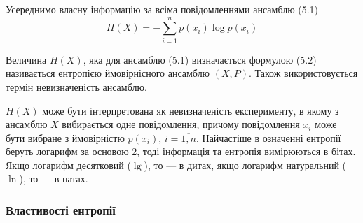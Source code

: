 Усереднимо власну інформацію за всіма повідомленнями ансамблю (5.1)
$$H(X) = - \sum\limits_{i=1}^{n} p(x_i) \log p(x_i)$$

\begin{definition}
    Величина $H(X)$, яка для ансамблю (5.1) визначається
    формулою (5.2) називається ентропією ймовірнісного ансамблю $(X, P)$. Також
    використовується термін невизначеність ансамблю.
\end{definition}

$H(X)$ може бути інтерпретована як невизначеність експерименту, в
якому з ансамблю $X$ вибирається одне повідомлення, причому повідомлення
$x_i$ може бути вибране з ймовірністю
$p(x_i)$, $i = \overline{1, n}$. Найчастіше в означенні
ентропії беруть логарифм за основою 2, тоді інформація та ентропія
вимірюються в бітах. Якщо логарифм десятковий ($\lg$), то --- в дитах, якщо
логарифм натуральний ($\ln$), то --- в натах.

\subsubsection{Властивості ентропії}

